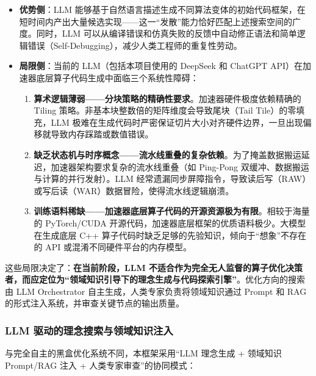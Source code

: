 \documentclass{CjC}
\begin{document}
    \begin{itemize}
        \item \textbf{优势侧}：LLM 能够基于自然语言描述生成不同算法变体的初始代码框架，在短时间内产出大量候选实现——这一“发散”能力恰好匹配上述搜索空间的广度。同时，LLM
            可以从编译错误和仿真失败的反馈中自动修正语法和简单逻辑错误（Self-Debugging），减少人类工程师的重复性劳动。

        \item \textbf{局限侧}：当前的 LLM（包括本项目使用的 DeepSeek 和 ChatGPT API）在加速器底层算子代码生成中面临三个系统性障碍：
            \begin{enumerate}
                \item \textbf{算术逻辑薄弱——分块策略的精确性要求}。加速器硬件极度依赖精确的
                    Tiling 策略。非基本块整数倍的矩阵维度会导致尾块（Tail Tile）的零填充，LLM
                    极难在生成代码时严密保证切片大小对齐硬件边界，一旦出现偏移就导致内存踩踏或数值错误。

                \item \textbf{缺乏状态机与时序概念——流水线重叠的复杂依赖}。为了掩盖数据搬运延迟，加速器架构要求复杂的流水线重叠（如
                    Ping-Pong 双缓冲、数据搬运与计算的并行发射）。LLM 经常遗漏同步屏障指令，导致读后写（RAW）或写后读（WAR）数据冒险，使得流水线逻辑崩溃。

                \item \textbf{训练语料稀缺——加速器底层算子代码的开源资源极为有限}。相较于海量的
                    PyTorch/CUDA 开源代码，加速器底层框架的优质语料极少。大模型在生成底层
                    C++ 算子代码时缺乏足够的先验知识，倾向于“想象”不存在的 API 或混淆不同硬件平台的内存模型。
            \end{enumerate}
    \end{itemize}

    这些局限决定了：\textbf{在当前阶段，LLM
    不适合作为完全无人监督的算子优化决策者，而应定位为“领域知识引导下的理念生成与代码探索引擎”}。优化方向的搜索由
    LLM Orchestrator 自主生成，人类专家负责将领域知识通过 Prompt 和 RAG 的形式注入系统，并审查关键节点的输出质量。

    \subsubsection{LLM 驱动的理念搜索与领域知识注入}

    与完全自主的黑盒优化系统不同，本框架采用“LLM 理念生成 + 领域知识 Prompt/RAG 注入
    + 人类专家审查”的协同模式：
\end{document}
